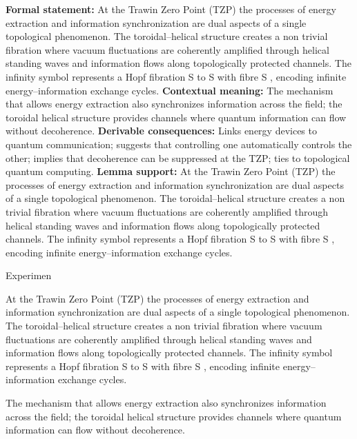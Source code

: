 \begingroup\footnotesize\setlength{\emergencystretch}{3em}\sloppy
\textbf{Formal statement:} At the Trawin Zero Point (TZP) the processes of energy extraction and information synchronization are dual aspects of a single topological phenomenon. The toroidal--helical structure creates a non trivial fibration where vacuum fluctuations are coherently amplified through helical standing waves and information flows along topologically protected channels. The infinity symbol represents a Hopf fibration S  to S  with fibre S , encoding infinite energy--information exchange cycles.
\textbf{Contextual meaning:} The mechanism that allows energy extraction also synchronizes information across the field; the toroidal helical structure provides channels where quantum information can flow without decoherence.  
\textbf{Derivable consequences:} Links energy devices to quantum communication; suggests that controlling one automatically controls the other; implies that decoherence can be suppressed at the TZP; ties to topological quantum computing.  
\textbf{Lemma support:} At the Trawin Zero Point (TZP) the processes of energy extraction and information synchronization are dual aspects of a single topological phenomenon. The toroidal--helical structure creates a non trivial fibration where vacuum fluctuations are coherently amplified through helical standing waves and information flows along topologically protected channels. The infinity symbol represents a Hopf fibration S  to S  with fibre S , encoding infinite energy--information exchange cycles.\par
\endgroup

Experimen

At the Trawin Zero Point (TZP) the processes of energy extraction and information synchronization are dual aspects of a single topological phenomenon. The toroidal--helical structure creates a non trivial fibration where vacuum fluctuations are coherently amplified through helical standing waves and information flows along topologically protected channels. The infinity symbol represents a Hopf fibration S  to S  with fibre S , encoding infinite energy--information exchange cycles.

The mechanism that allows energy extraction also synchronizes information across the field; the toroidal helical structure provides channels where quantum information can flow without decoherence.  
\endgroup

